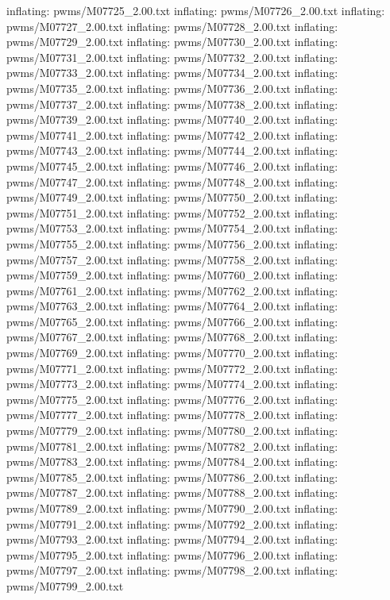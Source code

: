 \documentclass[letterpaper,10pt,english]{sphinxmanual}
\begin{document}
{\begin{sphinxVerbatim}[commandchars=\\\{\}]
  inflating: pwms/M07725\_2.00.txt
  inflating: pwms/M07726\_2.00.txt
  inflating: pwms/M07727\_2.00.txt
  inflating: pwms/M07728\_2.00.txt
  inflating: pwms/M07729\_2.00.txt
  inflating: pwms/M07730\_2.00.txt
  inflating: pwms/M07731\_2.00.txt
  inflating: pwms/M07732\_2.00.txt
  inflating: pwms/M07733\_2.00.txt
  inflating: pwms/M07734\_2.00.txt
  inflating: pwms/M07735\_2.00.txt
  inflating: pwms/M07736\_2.00.txt
  inflating: pwms/M07737\_2.00.txt
  inflating: pwms/M07738\_2.00.txt
  inflating: pwms/M07739\_2.00.txt
  inflating: pwms/M07740\_2.00.txt
  inflating: pwms/M07741\_2.00.txt
  inflating: pwms/M07742\_2.00.txt
  inflating: pwms/M07743\_2.00.txt
  inflating: pwms/M07744\_2.00.txt
  inflating: pwms/M07745\_2.00.txt
  inflating: pwms/M07746\_2.00.txt
  inflating: pwms/M07747\_2.00.txt
  inflating: pwms/M07748\_2.00.txt
  inflating: pwms/M07749\_2.00.txt
  inflating: pwms/M07750\_2.00.txt
  inflating: pwms/M07751\_2.00.txt
  inflating: pwms/M07752\_2.00.txt
  inflating: pwms/M07753\_2.00.txt
  inflating: pwms/M07754\_2.00.txt
  inflating: pwms/M07755\_2.00.txt
  inflating: pwms/M07756\_2.00.txt
  inflating: pwms/M07757\_2.00.txt
  inflating: pwms/M07758\_2.00.txt
  inflating: pwms/M07759\_2.00.txt
  inflating: pwms/M07760\_2.00.txt
  inflating: pwms/M07761\_2.00.txt
  inflating: pwms/M07762\_2.00.txt
  inflating: pwms/M07763\_2.00.txt
  inflating: pwms/M07764\_2.00.txt
  inflating: pwms/M07765\_2.00.txt
  inflating: pwms/M07766\_2.00.txt
  inflating: pwms/M07767\_2.00.txt
  inflating: pwms/M07768\_2.00.txt
  inflating: pwms/M07769\_2.00.txt
  inflating: pwms/M07770\_2.00.txt
  inflating: pwms/M07771\_2.00.txt
  inflating: pwms/M07772\_2.00.txt
  inflating: pwms/M07773\_2.00.txt
  inflating: pwms/M07774\_2.00.txt
  inflating: pwms/M07775\_2.00.txt
  inflating: pwms/M07776\_2.00.txt
  inflating: pwms/M07777\_2.00.txt
  inflating: pwms/M07778\_2.00.txt
  inflating: pwms/M07779\_2.00.txt
  inflating: pwms/M07780\_2.00.txt
  inflating: pwms/M07781\_2.00.txt
  inflating: pwms/M07782\_2.00.txt
  inflating: pwms/M07783\_2.00.txt
  inflating: pwms/M07784\_2.00.txt
  inflating: pwms/M07785\_2.00.txt
  inflating: pwms/M07786\_2.00.txt
  inflating: pwms/M07787\_2.00.txt
  inflating: pwms/M07788\_2.00.txt
  inflating: pwms/M07789\_2.00.txt
  inflating: pwms/M07790\_2.00.txt
  inflating: pwms/M07791\_2.00.txt
  inflating: pwms/M07792\_2.00.txt
  inflating: pwms/M07793\_2.00.txt
  inflating: pwms/M07794\_2.00.txt
  inflating: pwms/M07795\_2.00.txt
  inflating: pwms/M07796\_2.00.txt
  inflating: pwms/M07797\_2.00.txt
  inflating: pwms/M07798\_2.00.txt
  inflating: pwms/M07799\_2.00.txt

\end{sphinxVerbatim}}
\end{document}
